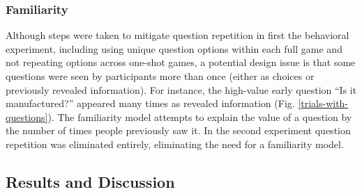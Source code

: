 \documentclass[11pt,letterpaper]{article}
\begin{document}
\subsubsection*{Familiarity}
Although steps were taken to mitigate question repetition in first the behavioral experiment, including using unique question options within each full game and not repeating options across one-shot games, a potential design issue is that some questions were seen by participants more than once (either as choices or previously revealed information).
For instance, the high-value early question ``Is it manufactured?'' appeared many times as revealed information (Fig.
\ref{trials-with-questions}).
The familiarity model attempts to explain the value of a question by the number of times people previously saw it.
In the second experiment question repetition was eliminated entirely, eliminating the need for a familiarity model.

\subsection*{Results and Discussion}
\end{document}
